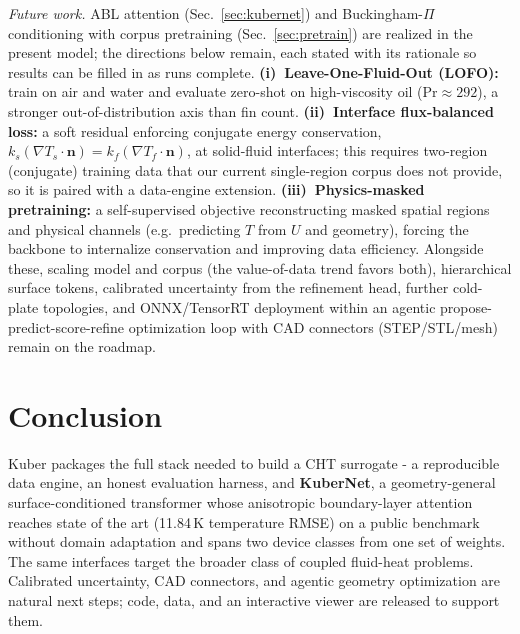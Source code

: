 \documentclass[conference]{IEEEtran}
\begin{document}
\textit{Future work.} ABL attention (Sec.~\ref{sec:kubernet}) and Buckingham-$\Pi$ conditioning with corpus
pretraining (Sec.~\ref{sec:pretrain}) are realized in the present model; the directions below remain, each
stated with its rationale so results can be filled in as runs complete. \textbf{(i)~Leave-One-Fluid-Out
(LOFO):} train on air and water and evaluate zero-shot on high-viscosity oil ($\mathrm{Pr}\approx292$), a
stronger out-of-distribution axis than fin count. \textbf{(ii)~Interface flux-balanced loss:} a soft residual
enforcing conjugate energy conservation, $k_s(\nabla T_s\!\cdot\!\mathbf{n})=k_f(\nabla T_f\!\cdot\!\mathbf{n})$,
at solid-fluid interfaces; this requires two-region (conjugate) training data that our current
single-region corpus does not provide, so it is paired with a data-engine extension.
\textbf{(iii)~Physics-masked pretraining:} a self-supervised objective reconstructing masked spatial regions
and physical channels (e.g.\ predicting $T$ from $U$ and geometry), forcing the backbone to internalize
conservation and improving data efficiency. Alongside these, scaling model and corpus (the value-of-data
trend favors both), hierarchical surface tokens, calibrated uncertainty from the refinement head, further
cold-plate topologies, and ONNX/TensorRT deployment within an agentic propose-predict-score-refine
optimization loop with CAD connectors (STEP/STL/mesh) remain on the roadmap.

\section{Conclusion}
Kuber packages the full stack needed to build a CHT surrogate - a reproducible data engine, an honest
evaluation harness, and \textbf{KuberNet}, a geometry-general surface-conditioned transformer whose
anisotropic boundary-layer attention reaches state of the art (11.84\,K temperature RMSE) on a public
benchmark without domain adaptation and spans two device classes from one set of weights. The same interfaces target the broader class of
coupled fluid-heat problems. Calibrated uncertainty, CAD connectors, and agentic geometry optimization
are natural next steps; code, data, and an interactive viewer are released to support them.
\end{document}
